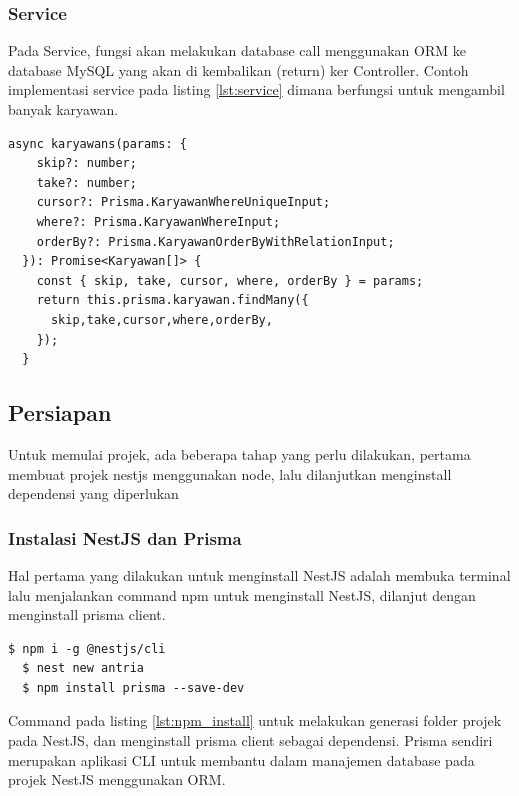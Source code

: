 \subsubsection{Service}
Pada Service, fungsi akan melakukan database call menggunakan ORM ke database MySQL yang akan di kembalikan (return) ker Controller\cite{NestJS}. Contoh implementasi service pada listing \ref{lst:service} dimana berfungsi untuk mengambil banyak karyawan.
\begin{lstlisting}[caption={Service},label={lst:service}]
  async karyawans(params: {
    skip?: number;
    take?: number;
    cursor?: Prisma.KaryawanWhereUniqueInput;
    where?: Prisma.KaryawanWhereInput;
    orderBy?: Prisma.KaryawanOrderByWithRelationInput;
  }): Promise<Karyawan[]> {
    const { skip, take, cursor, where, orderBy } = params;
    return this.prisma.karyawan.findMany({
      skip,take,cursor,where,orderBy,
    });
  }
\end{lstlisting}

\subsection{Persiapan}
Untuk memulai projek, ada beberapa tahap yang perlu dilakukan, pertama membuat projek nestjs menggunakan node, lalu dilanjutkan menginstall dependensi yang diperlukan

\subsubsection{Instalasi NestJS dan Prisma}
Hal pertama yang dilakukan untuk menginstall NestJS adalah membuka terminal lalu menjalankan command npm untuk menginstall NestJS, dilanjut dengan menginstall prisma client.
\begin{lstlisting}[caption={terminal: npm},label={lst:npm_install}]
  $ npm i -g @nestjs/cli
  $ nest new antria
  $ npm install prisma --save-dev
\end{lstlisting}
Command pada listing \ref{lst:npm_install} untuk melakukan generasi folder projek pada NestJS, dan menginstall prisma client sebagai dependensi. Prisma sendiri merupakan aplikasi CLI untuk membantu dalam manajemen database pada projek NestJS menggunakan ORM.

